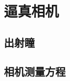 \section{逼真相机}\label{sec:逼真相机}

\subsection{出射瞳}\label{sub:出射瞳}
\subsection{相机测量方程}\label{sub:相机测量方程}